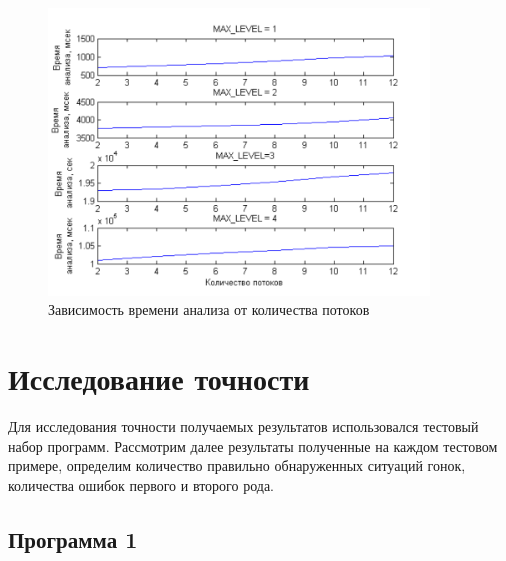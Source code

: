 \begin{figure}
  \centering
  \includegraphics[width=0.9\textwidth]{inc/png/graphic5}
  \caption{Зависимость времени анализа от количества потоков}
  \label{fig:graphic5}
\end{figure}


\section{Исследование точности}

Для исследования точности получаемых результатов использовался тестовый набор программ. Рассмотрим далее результаты полученные на каждом тестовом примере, определим количество правильно обнаруженных ситуаций гонок, количества ошибок первого и второго рода.

\subsection{Программа 1}

